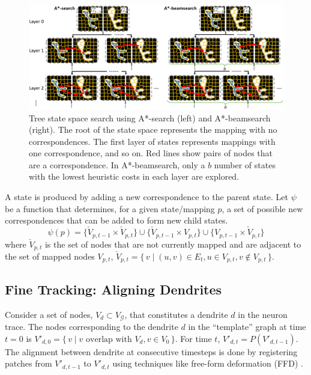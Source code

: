 \documentclass{article}
\begin{document}
\begin{figure}[t!]
	\centering
	\vspace{-10pt}
	\includegraphics[width=\textwidth]{img/asearch.png}
	\vspace{-20pt}
	\caption{\small{Tree state space search using A*-search (left) and A*-beamsearch (right). The root of the state space represents the mapping with no correspondences. The first layer of states represents mappings with one correspondence, and so on. Red lines show pairs of nodes that are a correspondence. In A*-beamsearch, only a $b$ number of states with the lowest heuristic costs in each layer are explored.}}
	\label{fig:treesearch}
	\vspace{-10pt}
\end{figure}


A state is produced by adding a new correspondence to the parent state. Let $\psi$ be a function that determines, for a given state/mapping $p$, a set of possible new correspondences that can be added to form new child states. 
\small
\begin{equation}
\psi(p) = \{ \check{V}_{p,t-1} \times \check{V}_{p,t} \} \cup \{ \check{V}_{p,t-1} \times V_{p,t} \} \cup \{ V_{p,t-1} \times \check{V}_{p,t} \}
\end{equation}
\normalsize
where $\check{V}_{p,t}$ is the set of nodes that are not currently mapped and are adjacent to the set of mapped nodes $V_{p,t}$, $\check{V}_{p,t} = \{\, v \mid (u,v) \in E_t, u \in V_{p,t}, v \notin V_{p,t} \,\}$.



\subsection{Fine Tracking: Aligning Dendrites}

Consider a set of nodes, $V_d \subset V_\mathcal{G}$, that constitutes a dendrite $d$ in the neuron trace. The nodes corresponding to the dendrite $d$ in the ``template'' graph at time $t = 0$ is $V'_{d,0} = \{\,v \mid v \text{ overlap with } V_d, v \in V_0 \,\}$. For time $t$, $V'_{d,t} = P( V'_{d,t-1})$. The alignment between dendrite at consecutive timesteps is done by registering patches from $V'_{d,t-1}$ to $V'_{d,t}$ using techniques like free-form deformation (FFD) \cite{Rueckert1999}.
\end{document}
